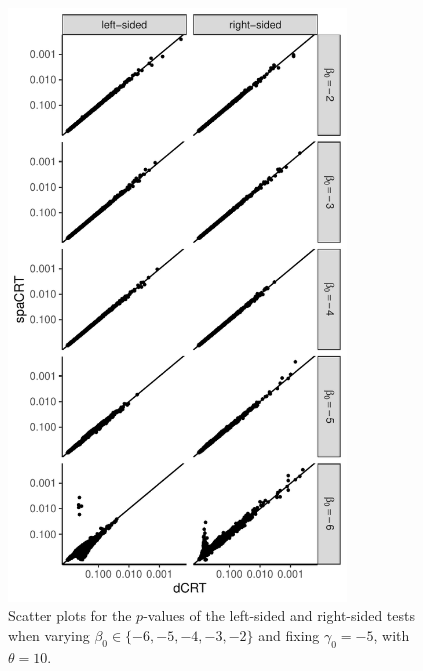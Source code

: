 \documentclass[12pt]{article}
\theoremstyle{definition}
\begin{document}
\begin{figure}
  \centering
  \includegraphics[width=0.8\textwidth]{figures-and-tables/simulation/QQ/plot-bin-NB-normal-B-50000-n-5000-5e3-n5-n5-disp-10full-dCRT-spaCRT-varying-beta.pdf}
  \caption{Scatter plots for the $p$-values of the left-sided and right-sided tests when varying $\beta_0\in \{-6,-5,-4,-3,-2\}$ and fixing $\gamma_0=-5$, with $\theta = 10$.}
  \label{fig:simulation-dot-plot-varying-beta-theta-10}
\end{figure}
\end{document}
